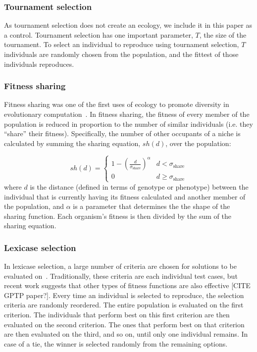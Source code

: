 \subsubsection{Tournament selection}
As tournament selection does not create an ecology, we include it in this paper as a control. Tournament selection has one important parameter, $T$, the size of the tournament. To select an individual to reproduce using tournament selection, $T$ individuals are randomly chosen from the population, and the fittest of those individuals reproduces.


\subsubsection{Fitness sharing}

Fitness sharing was one of the first uses of ecology to promote diversity in evolutionary computation~\cite{goldberg_genetic_1987}. In fitness sharing, the fitness of every member of the population is reduced in proportion to the number of similar individuals (i.e. they ``share'' their fitness). Specifically, the number of other occupants of a niche is calculated by summing the sharing equation, $sh(d)$, over the population:

\begin{equation} sh(d) =    \begin{cases}
      1 - (\frac{d}{\sigma_{\text{share}}})^{\alpha} & d < \sigma_{\text{share}}\\
      0 &  d \geq \sigma_{\text{share}}  
   \end{cases}
\label{eq:fit_share}
\end{equation}
where $d$ is the distance (defined in terms of genotype or phenotype) between the individual that is currently having its fitness calculated and another member of the population, and $\alpha$ is a parameter that determines the the shape of the sharing function. Each organism's fitness is then divided by the sum of the sharing equation.

\subsubsection{Lexicase selection}

In lexicase selection, a large number of criteria are chosen for solutions to be evaluated on~\cite{spector_assessment_2012}. Traditionally, these criteria are each individual test cases, but recent work suggests that other types of fitness functions are also effective [CITE GPTP paper?]. Every time an individual is selected to reproduce, the selection criteria are randomly reordered. The entire population is evaluated on the first criterion. The individuals that perform best on this first criterion are then evaluated on the second criterion. The ones that perform best on that criterion are then evaluated on the third, and so on, until only one individual remains. In case of a tie, the winner is selected randomly from the remaining options.


